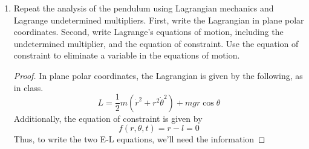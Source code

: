 \documentclass[../psets.tex]{subfiles}
\begin{document}
\begin{enumerate}
\begin{enumerate}
\begin{proof}
\begin{align*}
                \vec{F}_T+mg\hat{x} &= m(\ddot{r}-r\dot{\theta}^2)\hat{r}+m(r\ddot{\theta}+2\dot{r}\dot{\theta})\hat{\theta}\\
                \vec{F}_T &= m(\ddot{r}-r\dot{\theta}^2)\hat{r}+m(r\ddot{\theta}+2\dot{r}\dot{\theta})\hat{\theta}-mg[(\cos\theta)\hat{r}-(\sin\theta)\hat{\theta}]\\
                &= m(0-l\dot{\theta}^2)\hat{r}+m(l\ddot{\theta}+2\cdot 0\cdot\dot{\theta})\hat{\theta}-mg[(\cos\theta)\hat{r}-(\sin\theta)\hat{\theta}]\\
                &= (-ml\dot{\theta}^2-mg\cos\theta)\hat{r}+(ml\ddot{\theta}+mg\sin\theta)\hat{\theta}
            \end{align*}
            Thus, since we know from physical considerations that the tension force is purely radial, we must set $ml\ddot{\theta}+mg\sin\theta$ equal to zero to obtain
            \begin{equation*}
                \boxed{\vec{F}_T = (-ml\dot{\theta}^2-mg\cos\theta)\hat{r}}
            \end{equation*}
            In fact, setting the $\hat{\theta}$ component of the above expression equal to zero also gives us Newton's equation for the pendulum in plane polar coordinates!
            \begin{equation*}
                \boxed{l\ddot{\theta}+g\sin\theta = 0}
            \end{equation*}
        \end{proof}
        \item Repeat the analysis of the pendulum using Lagrangian mechanics and Lagrange undetermined multipliers. First, write the Lagrangian in plane polar coordinates. Second, write Lagrange's equations of motion, including the undetermined multiplier, and the equation of constraint. Use the equation of constraint to eliminate a variable in the equations of motion.
        \begin{proof}
            In plane polar coordinates, the Lagrangian is given by the following, as in class.
            \begin{equation*}
                \boxed{L = \frac{1}{2}m(\dot{r}^2+r^2\dot{\theta}^2)+mgr\cos\theta}
            \end{equation*}
            Additionally, the equation of constraint is given by
            \begin{equation*}
                f(r,\theta,t) = r-l = 0
            \end{equation*}
            Thus, to write the two E-L equations, we'll need the information

\end{proof}
\end{enumerate}
\end{enumerate}
\end{document}
